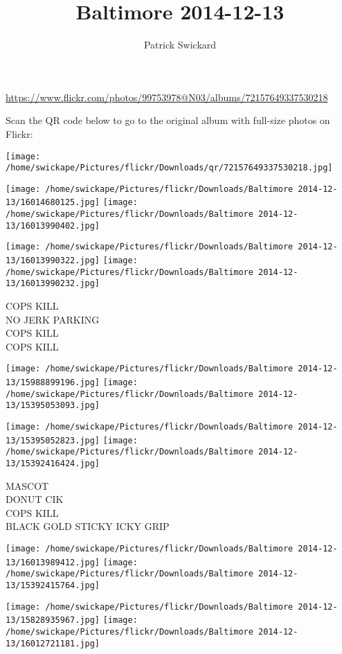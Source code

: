 \documentclass[10pt,letterpaper]{article}
\title{Baltimore 2014-12-13}
\author{Patrick Swickard}
\date{}
\begin{document}
\maketitle

\url{https://www.flickr.com/photos/99753978@N03/albums/72157649337530218}

Scan the QR code below to go to the original album with full-size photos on Flickr:

\texttt{[image: /home/swickape/Pictures/flickr/Downloads/qr/72157649337530218.jpg]}
\pagebreak

\texttt{[image: /home/swickape/Pictures/flickr/Downloads/Baltimore 2014-12-13/16014680125.jpg]}
\texttt{[image: /home/swickape/Pictures/flickr/Downloads/Baltimore 2014-12-13/16013990402.jpg]}

\texttt{[image: /home/swickape/Pictures/flickr/Downloads/Baltimore 2014-12-13/16013990322.jpg]}
\texttt{[image: /home/swickape/Pictures/flickr/Downloads/Baltimore 2014-12-13/16013990232.jpg]}

COPS KILL\\
NO JERK PARKING\\
COPS KILL\\
COPS KILL
\pagebreak

\texttt{[image: /home/swickape/Pictures/flickr/Downloads/Baltimore 2014-12-13/15988899196.jpg]}
\texttt{[image: /home/swickape/Pictures/flickr/Downloads/Baltimore 2014-12-13/15395053093.jpg]}

\texttt{[image: /home/swickape/Pictures/flickr/Downloads/Baltimore 2014-12-13/15395052823.jpg]}
\texttt{[image: /home/swickape/Pictures/flickr/Downloads/Baltimore 2014-12-13/15392416424.jpg]}

MASCOT\\
DONUT CIK\\
COPS KILL\\
BLACK GOLD STICKY ICKY GRIP
\pagebreak

\texttt{[image: /home/swickape/Pictures/flickr/Downloads/Baltimore 2014-12-13/16013989412.jpg]}
\texttt{[image: /home/swickape/Pictures/flickr/Downloads/Baltimore 2014-12-13/15392415764.jpg]}

\texttt{[image: /home/swickape/Pictures/flickr/Downloads/Baltimore 2014-12-13/15828935967.jpg]}
\texttt{[image: /home/swickape/Pictures/flickr/Downloads/Baltimore 2014-12-13/16012721181.jpg]}
\end{document}
